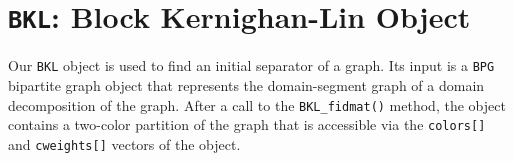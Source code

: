 \chapter{{\tt BKL}: Block Kernighan-Lin Object}
\label{chapter:BKL}
\par
Our {\tt BKL} object is used to find an initial separator of a
graph.
Its input is a {\tt BPG} bipartite graph object that represents the
domain-segment graph of a domain decomposition of the graph.
After a call to the {\tt BKL\_fidmat()} method, the object contains
a two-color partition of the graph that is accessible via the
{\tt colors[]} and {\tt cweights[]} vectors of the object.

